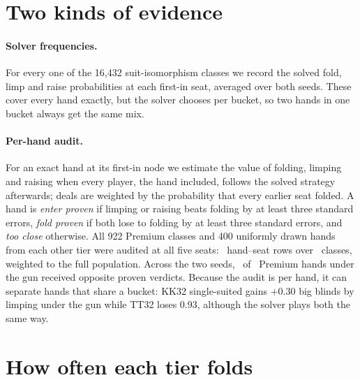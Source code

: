 \documentclass[10pt]{article}
\begin{document}
\section{Two kinds of evidence}
\paragraph{Solver frequencies.} For every one of the 16{,}432 suit-isomorphism classes we record the
solved fold, limp and raise probabilities at each first-in seat, averaged over both seeds. These
cover every hand exactly, but the solver chooses per bucket, so two hands in one bucket always get
the same mix.

\paragraph{Per-hand audit.} For an exact hand at its first-in node we estimate the value of folding,
limping and raising when every player, the hand included, follows the solved strategy afterwards;
deals are weighted by the probability that every earlier seat folded. A hand is \emph{enter
proven} if limping or raising beats folding by at least three standard errors, \emph{fold proven}
if both lose to folding by at least three standard errors, and \emph{too close} otherwise. All 922
Premium classes and 400 uniformly drawn hands from each other tier were audited at all five seats:
\AuditRows\ hand--seat rows over \AuditClasses\ classes, weighted to the full population. Across the
two seeds, \SeedContra\ of \SeedPairs\ Premium hands under the gun received opposite proven verdicts.
Because the audit is per hand, it can separate hands that share a bucket: KK32 single-suited gains
$+0.30$ big blinds by limping under the gun while TT32 loses $0.93$, although the solver plays both
the same way.

\section{How often each tier folds}
\begin{table}[H]
\centering
\caption{Solved first-in mix, fold/limp/raise (\%), mean of two seeds.}
\label{tab:tiers}
\small

\end{table}

\begin{table}[H]
\centering
\caption{Per-hand audit: share of combinations proven to enter / too close / proven to fold (\%).}
\label{tab:verdicts}
\small

\end{table}
\end{document}
